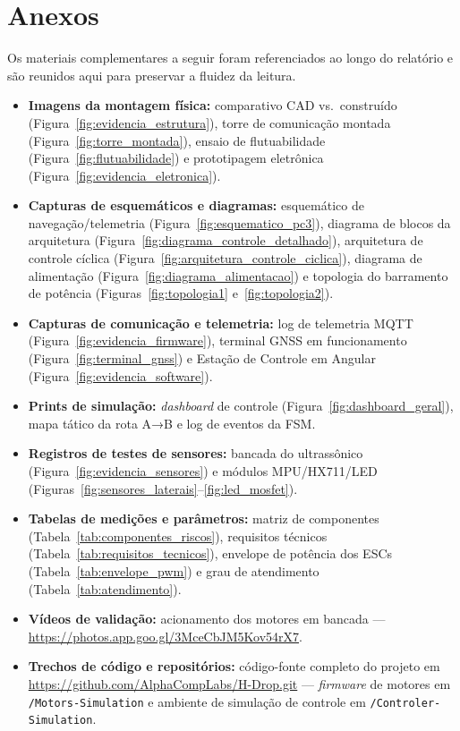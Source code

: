 \documentclass[12pt,a4paper]{article}
\begin{document}
\printbibliography[title={Referências}]
\nocite{*}

\section{Anexos}

Os materiais complementares a seguir foram referenciados ao longo do relatório e são reunidos aqui para preservar a fluidez da leitura.

\begin{itemize}
\item \textbf{Imagens da montagem física:} comparativo CAD vs.\ construído (Figura~\ref{fig:evidencia_estrutura}), torre de comunicação montada (Figura~\ref{fig:torre_montada}), ensaio de flutuabilidade (Figura~\ref{fig:flutuabilidade}) e prototipagem eletrônica (Figura~\ref{fig:evidencia_eletronica}).
\item \textbf{Capturas de esquemáticos e diagramas:} esquemático de navegação/telemetria (Figura~\ref{fig:esquematico_pc3}), diagrama de blocos da arquitetura (Figura~\ref{fig:diagrama_controle_detalhado}), arquitetura de controle cíclica (Figura~\ref{fig:arquitetura_controle_ciclica}), diagrama de alimentação (Figura~\ref{fig:diagrama_alimentacao}) e topologia do barramento de potência (Figuras~\ref{fig:topologia1} e~\ref{fig:topologia2}).
\item \textbf{Capturas de comunicação e telemetria:} log de telemetria MQTT (Figura~\ref{fig:evidencia_firmware}), terminal GNSS em funcionamento (Figura~\ref{fig:terminal_gnss}) e Estação de Controle em Angular (Figura~\ref{fig:evidencia_software}).
\item \textbf{Prints de simulação:} \textit{dashboard} de controle (Figura~\ref{fig:dashboard_geral}), mapa tático da rota A→B e log de eventos da FSM.
\item \textbf{Registros de testes de sensores:} bancada do ultrassônico (Figura~\ref{fig:evidencia_sensores}) e módulos MPU/HX711/LED (Figuras~\ref{fig:sensores_laterais}--\ref{fig:led_mosfet}).
\item \textbf{Tabelas de medições e parâmetros:} matriz de componentes (Tabela~\ref{tab:componentes_riscos}), requisitos técnicos (Tabela~\ref{tab:requisitos_tecnicos}), envelope de potência dos ESCs (Tabela~\ref{tab:envelope_pwm}) e grau de atendimento (Tabela~\ref{tab:atendimento}).
\item \textbf{Vídeos de validação:} acionamento dos motores em bancada — \url{https://photos.app.goo.gl/3MceCbJM5Kov54rX7}.
\item \textbf{Trechos de código e repositórios:} código-fonte completo do projeto em \url{https://github.com/AlphaCompLabs/H-Drop.git} — \textit{firmware} de motores em \texttt{/Motors-Simulation} e ambiente de simulação de controle em \texttt{/Controler-Simulation}.
\end{itemize}

\end{document}
